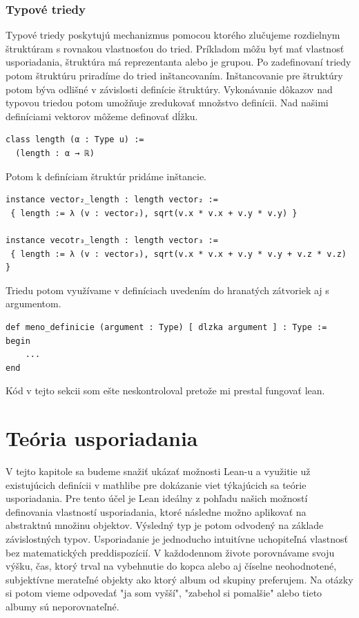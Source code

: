 \documentclass[a4paper,10pt,oneside]{report}%
\begin{document}
\subsection{Typové triedy}
    Typové triedy poskytujú mechanizmus pomocou ktorého zlučujeme rozdielnym štruktúram
s rovnakou vlastnosťou do tried.
    Príkladom môžu byť mať vlastnosť usporiadania, štruktúra má reprezentanta alebo
je grupou.
    Po zadefinovaní triedy potom štruktúru priradíme do tried inštancovaním.
    Inštancovanie pre štruktúry potom býva odlišné v závislosti definície štruktúry.
    Vykonávanie dôkazov nad typovou triedou potom umožňuje zredukovať množstvo definícii.
    Nad našimi definíciami vektorov môžeme definovať dĺžku.
\begin{lstlisting}
class length (α : Type u) :=
  (length : α → ℝ)
\end{lstlisting}
    Potom k definíciam štruktúr pridáme inštancie.
\begin{lstlisting}
instance vector₂_length : length vector₂ :=
 { length := λ (v : vector₂), sqrt(v.x * v.x + v.y * v.y) }

instance vecotr₃_length : length vector₃ :=
 { length := λ (v : vector₃), sqrt(v.x * v.x + v.y * v.y + v.z * v.z) }
\end{lstlisting}
    Triedu potom využívame v definíciach uvedením do hranatých zátvoriek aj s
argumentom.
\begin{lstlisting}
def meno_definicie (argument : Type) [ dlzka argument ] : Type :=
begin
    ...
end
\end{lstlisting}

Kód v tejto sekcii som ešte neskontroloval pretože mi prestal fungovať lean.

\chapter{Teória usporiadania}
    V tejto kapitole sa budeme snažiť ukázať možnosti Lean-u a využitie už existujúcich
definícii v mathlibe pre dokázanie viet týkajúcich sa teórie usporiadania.
    Pre tento účel je Lean ideálny z pohľadu našich možností definovania vlastností
usporiadania, ktoré následne možno aplikovať na abstraktnú množinu objektov.
    Výsledný typ je potom odvodený na základe závislostných typov.
    Usporiadanie je jednoducho intuitívne uchopiteľná vlastnosť bez matematických
preddispozícií.
    V každodennom živote porovnávame svoju výšku, čas, ktorý trval na vybehnutie do kopca
alebo aj číselne neohodnotené, subjektívne merateľné objekty ako ktorý album
od skupiny preferujem.
    Na otázky si potom vieme odpovedať "ja som vyšší", "zabehol si pomalšie" alebo
tieto albumy sú neporovnateľné.
\end{document}
